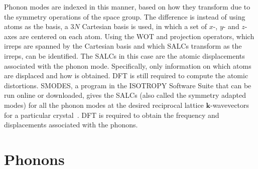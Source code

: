\documentclass[11pt]{article}
\numberwithin{equation}{section}
\begin{document}
Phonon modes are indexed in this manner, based on how they transform due to
the symmetry operations of the space group. The difference is instead of
using atoms as the basis, a $3N$ Cartesian basis is used, in which a set of
$x$-, $y$- and $z$-axes are centered on each atom. Using the WOT and
projection operators, which irreps are spanned by the Cartesian basis and
which SALCs transform as the irreps, can be identified. The SALCs in this
case are the atomic displacements associated with the phonon mode.
Specifically, only information on which atoms are displaced and how is
obtained. DFT is still required to compute the atomic distortions. SMODES, a
program in the ISOTROPY Software Suite that can be run online or downloaded,
gives the SALCs (also called the symmetry adapted modes) for all the phonon
modes at the desired reciprocal lattice $\mathbf{k}$-wavevectors for a
particular crystal~\cite{smodes}. DFT is required to obtain the frequency and
displacements associated with the phonons.

\section{Phonons}\label{sec:phonons}
\end{document}
